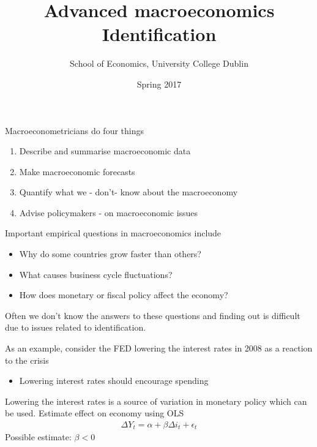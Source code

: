 \documentclass{beamer}
\title{Advanced macroeconomics \\ Identification}
\author{School of Economics, University College Dublin}
\date{Spring 2017}
\begin{document}
\begin{frame}
 \titlepage
\end{frame}

\begin{frame}
  Macroeconometricians do four things
  \begin{enumerate}
    \item Describe and summarise macroeconomic data
    \item Make macroeconomic forecasts
    \item Quantify what we - don't- know about the macroeconomy
    \item Advise policymakers - on macroeconomic issues
  \end{enumerate}
\end{frame}

\begin{frame}
  Important empirical questions in macroeconomics include
  \begin{itemize}
    \item Why do some countries grow faster than others?
    \medskip
    \item What causes business cycle fluctuations?
    \item How does monetary or fiscal policy affect the economy?    
  \end{itemize}  
\medskip
Often we don't know the answers to these questions and finding out is difficult due to issues related to identification.
\end{frame}

\begin{frame}
  As an example, consider the FED lowering the interest rates in 2008 as a reaction to the crisis
  \begin{itemize}
    \item Lowering interest rates should encourage spending
  \end{itemize}
  \medskip
  Lowering the interest rates is a source of variation in monetary policy which can be used.
  Estimate effect on economy using OLS
  \begin{align*}
    \Delta Y_t = \alpha + \beta \Delta i_t + \epsilon_t
  \end{align*}
  Possible estimate: $\beta<0$
\end{frame}
\end{document}
